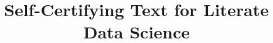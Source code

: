 \documentclass[acmsmall,screen]{acmart}
\begin{document}
\title[Self-Certifying Text for Literate Data Science]{Self-Certifying Text for Literate Data Science}
\maketitle





% 



\end{document}
